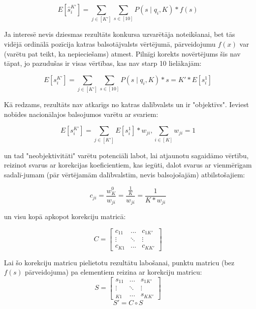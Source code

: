 \documentclass[12pt, a4paper]{article}
\numberwithin{equation}{section} %
\begin{document}
\begin{equation}
    E[\hat s_i^{K'}] = \sum_{j\in [K']}\sum_{s\in[10]}P(s\mid q_i, K)*f(s)
\end{equation}

Ja interesē nevis dziesmas rezultāts konkursa uzvarētāja noteikšanai, bet tās vidējā ordinālā pozīcija katras balsotājvalsts vērtējumā, pārveidojumu $f(x)$ var (varētu pat teikt, ka nepieciešams) atmest. Pilnīgi korekts novērtējums šis nav tāpat, jo pazudušas ir visas vērtības, kas nav starp 10 lielākajām:

\begin{equation}
    E[s_i^{K'}] = \sum_{j\in [K']}\sum_{s\in[10]}P(s\mid q_i, K)*s = K'*E[s_i^1]
\end{equation}

Kā redzams, rezultāts nav atkarīgs no katras dalībvalsts un ir "objektīvs". Ieviest nobīdes nacionālajos balsojumos varētu ar svariem:

\begin{equation}
    E[s_i^{K'}] = \sum_{j\in [K']}E[s_i^{1}]*w_{ji}, \sum_{i\in[K]} w_{ji} = 1
\end{equation}

un tad "neobjektivitāti" varētu potenciāli labot, lai atjaunotu sagaidāmo vērtību, reizinot svarus ar korekcijas koeficientiem, kas iegūti, dalot svarus ar vienmērīgam sadalī-jumam (pār vērtējamām dalībvalstīm, nevis balsojošajām) atbilstošajiem:

\begin{equation}
    c_{ji}=\frac{w_{K}^0}{w_{ji}}=\frac{\frac{1}{K}}{w_{ji}}=\frac{1}{K*w_{ji}}
\end{equation}

un visu kopā apkopot korekciju matricā:

\begin{equation}
    C=
    \begin{bmatrix}
        c_{11} &  ... & c_{1K'} \\
        \vdots & \ddots & \vdots \\
        c_{K1} &  ... & c_{KK'} 
    \end{bmatrix}
\end{equation}

Lai šo korekciju matricu pielietotu rezultātu labošanai, punktu matricu (bez $f(s)$ pārveidojuma) pa elementiem reizina ar korekciju matricu:
\begin{equation}
    S=
    \begin{bmatrix}
        s_{11} &  ... & s_{1K'} \\
        \vdots & \ddots & \vdots \\
        _{K1} &  ... & s_{KK'} 
    \end{bmatrix}
\end{equation}
\begin{equation}
    S' = C \circ S
\end{equation}
\end{document}
